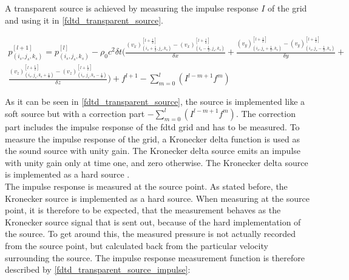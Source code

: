 A transparent source is achieved by measuring the impulse response $I$ of the grid and using it in \autoref{fdtd_transparent_source}.

\begin{multline}\label{fdtd_transparent_source}
p_{(i_{s},j_{s},k_{s})}^{[l+1]}=p_{(i_{s},j_{s},k_{s})}^{[l]} - \rho_0 c^2 \delta t  \Biggl( \frac{(v_x)_{(i_{s}+\frac{1}{2},j_{s},k_{s})}^{[l+\frac{1}{2}]} - (v_x)_{(i_{s}-\frac{1}{2},j_{s},k_{s})}^{[l+\frac{1}{2}]}}{\delta x} +
 \frac{(v_y)_{(i_{s},j_{s}+\frac{1}{2},k_{s})}^{[l+\frac{1}{2}]}-(v_y)_{(i_{s},j_{s}-\frac{1}{2},k_{s})}^{[l+\frac{1}{2}]}}{\delta y} + \\ 
 \frac{(v_z)_{(i_{s},j_{s},k_{s}+\frac{1}{2})}^{[l+\frac{1}{2}]}-(v_z)_{(i_{s},j_{s},k_{s}-\frac{1}{2})}^{[l+\frac{1}{2}]}}{\delta z} \Biggr)
+f^{l+1}-\sum_{m=0}^{l} \left( I^{l-m+1}f^m \right)
\end{multline}

        \startexplain
    \stopexplain

As it can be seen in \autoref{fdtd_transparent_source}, the source is implemented like a soft source but with a correction part $-\sum_{m=0}^{l} \left( I^{l-m+1}f^m \right)$. The correction part includes the impulse response of the \gls{fdtd} grid and has to be measured. To measure the impulse response of the grid, a Kronecker delta function is used as the sound source with unity gain. The Kronecker delta source emits an impulse with unity gain only at time one, and zero otherwise. The Kronecker delta source is implemented as a hard source \citep{FDTDtransparent}. \\


The impulse response is measured at the source point. As stated before, the Kronecker source is implemented as a hard source. When measuring at the source point, it is therefore to be expected, that the measurement behaves as the Kronecker source signal that is sent out, because of the hard implementation of the source. To get around this, the measured pressure is not actually recorded from the source point, but calculated back from the particular velocity surrounding the source.
The impulse response measurement function is therefore described by \autoref{fdtd_transparent_source_impulse}:

